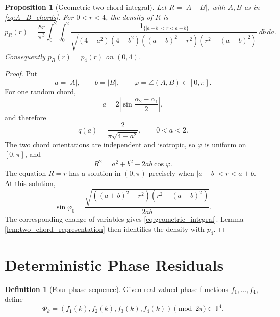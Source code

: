 \documentclass[11pt]{amsart}
\numberwithin{equation}{section}
\theoremstyle{plain}
\newtheorem{proposition}[theorem]{Proposition}
\theoremstyle{definition}
\newtheorem{definition}[theorem]{Definition}
\theoremstyle{remark}
\begin{document}
\begin{proposition}[Geometric two-chord integral]
\label{prop:geometric_integral}
Let \(R=|A-B|\), with \(A,B\) as in \eqref{eq:A_B_chords}. For \(0<r<4\), the density of \(R\) is
\begin{equation}
p_R(r)=\frac{8r}{\pi^3}\int_0^2\!\int_0^2
\frac{\mathbf 1_{\{|a-b|<r<a+b\}}}
{\sqrt{(4-a^2)(4-b^2)((a+b)^2-r^2)(r^2-(a-b)^2)}}\,db\,da.
\label{eq:geometric_integral}
\end{equation}
Consequently \(p_R(r)=p_4(r)\) on \((0,4)\).
\end{proposition}
\begin{proof}
Put
\begin{equation}
a=|A|,
\qquad b=|B|,
\qquad \varphi=\angle(A,B)\in[0,\pi].
\label{eq:chord_coordinates}
\end{equation}
For one random chord,
\begin{equation}
a=2\left|\sin\frac{\alpha_2-\alpha_1}{2}\right|,
\label{eq:chord_length}
\end{equation}
and therefore
\begin{equation}
q(a)=\frac{2}{\pi\sqrt{4-a^2}},
\qquad 0<a<2.
\label{eq:chord_density}
\end{equation}
The two chord orientations are independent and isotropic, so \(\varphi\) is uniform on \([0,\pi]\), and
\begin{equation}
R^2=a^2+b^2-2ab\cos\varphi.
\label{eq:law_cosines}
\end{equation}
The equation \(R=r\) has a solution in \((0,\pi)\) precisely when \(|a-b|<r<a+b\). At this solution,
\begin{equation}
\sin\varphi_0=\frac{\sqrt{((a+b)^2-r^2)(r^2-(a-b)^2)}}{2ab}.
\label{eq:sin_phi0}
\end{equation}
The corresponding change of variables gives \eqref{eq:geometric_integral}. Lemma \ref{lem:two_chord_representation} then identifies the density with \(p_4\).
\end{proof}

\section{Deterministic Phase Residuals}
\label{sec:deterministic_residuals}

\begin{definition}[Four-phase sequence]
\label{def:four_phase_sequence}
Given real-valued phase functions \(f_1,\ldots,f_4\), define
\begin{equation}
\Phi_k=(f_1(k),f_2(k),f_3(k),f_4(k))\pmod{2\pi}\in\mathbb T^4.
\label{eq:Phi_k}
\end{equation}
\end{definition}
\end{document}
